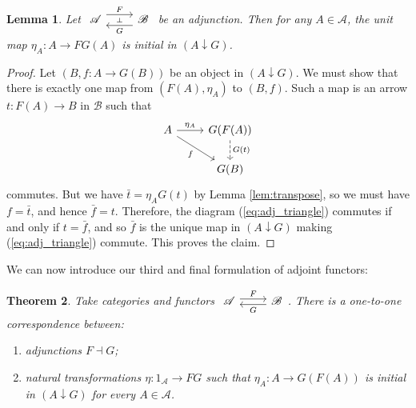 \documentclass[10pt,oneside]{book}
\def\~#1{\mathscr{#1}}
\theoremstyle{plain}
\newtheorem{thm}{Theorem}[section]
\newtheorem{lem}[thm]{Lemma}
\theoremstyle{definition}
\theoremstyle{remark}
\numberwithin{equation}{section}
\numberwithin{figure}{section}
\begin{document}
\begin{lem}
\label{lem:initial}
    Let $\begin{tikzcd}
    {\~A} & {\~B}
    \arrow[""{name=0, anchor=center, inner sep=0}, "F", shift left=2, from=1-1, to=1-2]
    \arrow[""{name=1, anchor=center, inner sep=0}, "G", shift left=2, from=1-2, to=1-1]
    \arrow["\dashv"{anchor=center, rotate=-90}, draw=none, from=0, to=1]
\end{tikzcd}$ be an adjunction. Then for any $A \in \~A$, the unit map $\eta_A: A \to FG(A)$ is initial in $(A \downarrow G)$.
\end{lem}

\begin{proof}
    Let $(B, f: A \to G(B))$ be an object in $(A \downarrow G)$. We must show that there is exactly one map from $(F(A), \eta_A)$ to $(B, f)$. Such a map is an arrow $t: F(A) \to B$ in $\~B$ such that 
\begin{equation}
\label{eq:adj_triangle}
    \begin{tikzcd}
    A & {G(F(A))} \\
    & {G(B)}
    \arrow["{\eta_A}", from=1-1, to=1-2]
    \arrow["f"', from=1-1, to=2-2]
    \arrow["{G(t)}", dashed, from=1-2, to=2-2]
\end{tikzcd}
\end{equation} 
commutes. But we have $\bar{t} = \eta_A G(t)$ by Lemma \ref{lem:transpose}, so we must have $f = \bar{t}$, and hence $\bar{f} = t$. Therefore, the diagram (\ref{eq:adj_triangle}) commutes if and only if $t = \bar{f}$, and so $\bar{f}$ is the unique map in $(A \downarrow G)$ making (\ref{eq:adj_triangle}) commute. This proves the claim.
\end{proof}

We can now introduce our third and final formulation of adjoint functors:

\begin{thm}
\label{thm:adjoint_initial}
Take categories and functors $\begin{tikzcd}
    {\~A} & {\~B}
    \arrow["F", shift left, from=1-1, to=1-2]
    \arrow["G", shift left, from=1-2, to=1-1]
\end{tikzcd}$. There is a one-to-one correspondence between:
\begin{enumerate}[label=(\roman*)]
    \item  adjunctions $F \dashv G$; 
    \item \label{thm:initial(ii)} natural transformations $\eta: 1_{\~A} \to FG$ such that $\eta_A: A \to G(F(A))$ is initial in $(A \downarrow G)$ for every $A  \in \~A$. 
\end{enumerate} 
\end{thm}
\end{document}
